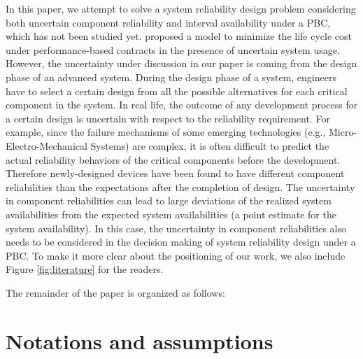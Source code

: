 \documentclass[preprint,12pt]{elsarticle}
\begin{document}
In this paper, we attempt to solve a system reliability design problem considering both uncertain component reliability and interval availability under a PBC, which has not been studied yet. \citet{Jin} proposed a model to minimize the life cycle cost under performance-based contracts in the presence of uncertain system usage.  However, the uncertainty under discussion in our paper is coming from  the design phase of an advanced system. During the design phase of a system, engineers have to select a certain design from all the possible alternatives for each critical component in the system. In real life, the outcome of any development process for a certain design is uncertain with respect to the reliability requirement. For example, since the failure mechanisms of some emerging technologies (e.g., Micro-Electro-Mechanical Systems) are complex, it is often difficult to predict the actual reliability behaviors of the critical components before the development. Therefore newly-designed devices have been found to have different component reliabilities than the expectations after the completion of design. The uncertainty in component reliabilities can lead to large deviations of the realized system availabilities from the expected system availabilities (a point estimate for the system availability). In this case, the uncertainty in component reliabilities also needs to be considered in the decision making of system reliability design under a PBC. To make it more clear about the positioning of our work, we also include Figure \ref{fig:literature} for the readers.



The remainder of the paper is organized as follows:


\section{Notations and assumptions}
\end{document}
